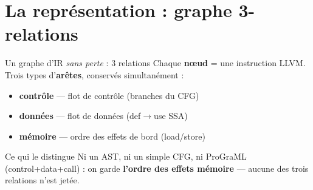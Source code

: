 \documentclass[aspectratio=169,11pt]{beamer}
\newcommand{\hl}[1]{\textcolor{jblue}{\textbf{#1}}}
\begin{document}
\section{La représentation : graphe 3-relations}
\begin{frame}{Un graphe d'IR \emph{sans perte} : 3 relations}
  Chaque \textbf{nœud} = une instruction LLVM. Trois types d'\textbf{arêtes},
  conservés simultanément :
  \vspace{2mm}
  \begin{itemize}
    \item \textcolor{jred}{\textbf{contrôle}} — flot de contrôle (branches du CFG)
    \item \textcolor{jblue}{\textbf{données}} — flot de données (def$\to$use SSA)
    \item \textcolor{jgreen}{\textbf{mémoire}} — ordre des effets de bord (load/store)
  \end{itemize}
  \vspace{3mm}
  \begin{block}{Ce qui le distingue}
    Ni un AST, ni un simple CFG, ni ProGraML (control+data+call) : on garde
    \hl{l'ordre des effets mémoire} — aucune des trois relations n'est jetée.
  \end{block}
\end{frame}

\end{document}
